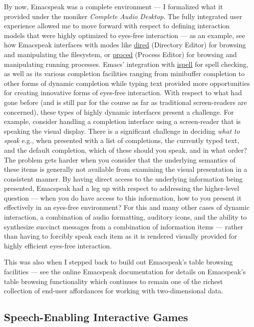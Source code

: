 \documentclass[11pt]{article}
\begin{document}
By now, Emacspeak was a complete environment — I formalized what
it provided under the moniker \emph{Complete Audio Desktop}. The fully
integrated user experience allowed me to move forward with
respect to defining interaction models that were highly optimized
to eyes-free interaction — as an example, see how Emacspeak
interfaces with modes like \uline{dired} (Directory Editor) for
browsing and manipulating the filesystem, or \uline{proced} (Process Editor) for
browsing and manipulating running processes. Emacs' integration
with \uline{ispell} for spell checking, as well as its various
completion facilities ranging from minibuffer completion to other
forms of dynamic completion while typing text provided more
opportunities for creating innovative forms of eyes-free
interaction. With respect to what had gone before (and is still
par for the course as far as traditional screen-readers are
concerned), these types of highly dynamic interfaces present a
challenge. For example, consider handling a completion interface
using a screen-reader that is speaking the visual display. There
is a significant challenge in deciding \emph{what to speak} e.g., when
presented with a list of completions, the currently typed text,
and the default completion, which of these should you speak, and
in what order?
The problem gets harder when you consider that the underlying
semantics of these items is generally not available from
examining the visual presentation in a consistent manner. By
having direct access to the underlying information being
presented, Emacspeak had a leg up with respect to addressing the
higher-level question  —   when you do have access to this
information, how to you present it effectively in an eyes-free
environment? For this and many other cases of dynamic
interaction, a combination of audio formatting, auditory icons,
and the ability to synthesize succinct messages from a
combination of information items  —   rather than having to
forcibly speak each item as it is rendered visually provided for
highly efficient eyes-free interaction. 


This was also when I stepped back to build out Emacspeak's table
browsing facilities — see the online Emacspeak documentation for
 details on Emacspeak's table  browsing functionality which
continues to remain one of the richest  collection of  end-user
affordances for working with two-dimensional data.

\subsection{Speech-Enabling Interactive Games}
\label{sec-9-1}
\end{document}
